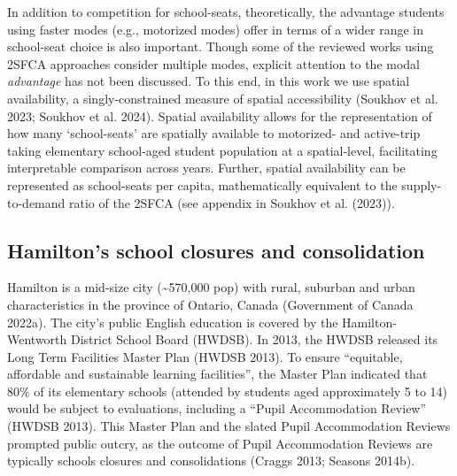 \documentclass[
default
]{sn-jnl}
\begin{document}
In addition to competition for school-seats, theoretically, the
advantage students using faster modes (e.g., motorized modes) offer in
terms of a wider range in school-seat choice is also important. Though
some of the reviewed works using 2SFCA approaches consider multiple
modes, explicit attention to the modal \emph{advantage} has not been
discussed. To this end, in this work we use spatial availability, a
singly-constrained measure of spatial accessibility (Soukhov et al.
2023; Soukhov et al. 2024). Spatial availability allows for the
representation of how many `school-seats' are spatially available to
motorized- and active-trip taking elementary school-aged student
population at a spatial-level, facilitating interpretable comparison
across years. Further, spatial availability can be represented as
school-seats per capita, mathematically equivalent to the
supply-to-demand ratio of the 2SFCA (see appendix in Soukhov et al.
(2023)).

\subsection{Hamilton's school closures and
consolidation}\label{hamiltons-school-closures-and-consolidation}

Hamilton is a mid-size city (\textasciitilde570,000 pop) with rural,
suburban and urban characteristics in the province of Ontario, Canada
(Government of Canada 2022a). The city's public English education is
covered by the Hamilton-Wentworth District School Board (HWDSB). In
2013, the HWDSB released its Long Term Facilities Master Plan (HWDSB
2013). To ensure ``equitable, affordable and sustainable learning
facilities'', the Master Plan indicated that 80\% of its elementary
schools (attended by students aged approximately 5 to 14) would be
subject to evaluations, including a ``Pupil Accommodation Review''
(HWDSB 2013). This Master Plan and the slated Pupil Accommodation
Reviews prompted public outcry, as the outcome of Pupil Accommodation
Reviews are typically schools closures and consolidations (Craggs 2013;
Seasons 2014b).
\end{document}
